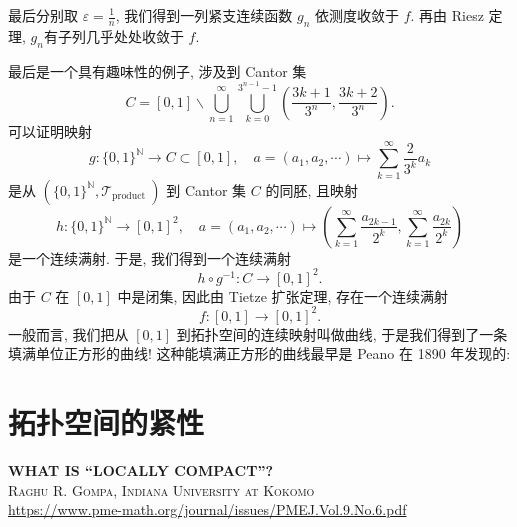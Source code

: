 \documentclass[options]{article}
\begin{document}
最后分别取 $\varepsilon=\frac{1}{n}$, 我们得到一列紧支连续函数 $g_n$ 依测度收敛于 $f$. 再由 Riesz 定理, $g_n$有子列几乎处处收敛于 $f$.

最后是一个具有趣味性的例子, 涉及到 Cantor 集
\[
C=[0,1] \backslash \bigcup_{n=1}^{\infty} \bigcup_{k=0}^{3^{n-1}-1}\left(\frac{3 k+1}{3^n}, \frac{3 k+2}{3^n}\right) .
\]
可以证明映射
\[
g:\{0,1\}^{\mathbb{N}} \rightarrow C \subset[0,1], \quad a=\left(a_1, a_2, \cdots\right) \mapsto \sum_{k=1}^{\infty} \frac{2}{3^k} a_k
\]
是从 $\left(\{0,1\}^{\mathbb{N}}, \mathscr{T}_{\text {product }}\right)$ 到 Cantor 集 $C$ 的同胚, 且映射
\[
h:\{0,1\}^{\mathbb{N}} \rightarrow[0,1]^2, \quad a=\left(a_1, a_2, \cdots\right) \mapsto\left(\sum_{k=1}^{\infty} \frac{a_{2 k-1}}{2^k}, \sum_{k=1}^{\infty} \frac{a_{2 k}}{2^k}\right)
\]
是一个连续满射. 于是, 我们得到一个连续满射
\[
h \circ g^{-1}: C \rightarrow[0,1]^2 .
\]
由于 $C$ 在 $[0,1]$ 中是闭集, 因此由 Tietze 扩张定理, 存在一个连续满射
\[
f:[0,1] \rightarrow[0,1]^2 .
\]
一般而言, 我们把从 $[0,1]$ 到拓扑空间的连续映射叫做曲线, 于是我们得到了一条填满单位正方形的曲线! 这种能填满正方形的曲线最早是 Peano 在 1890 年发现的:
\section{拓扑空间的紧性}
\begin{center}{\bf\Huge{WHAT IS ``LOCALLY COMPACT''?
		}}\\
	{{\scshape{Raghu R. Gompa, Indiana University at Kokomo}}\\\url{https://www.pme-math.org/journal/issues/PMEJ.Vol.9.No.6.pdf}}
\end{center}
\end{document}
